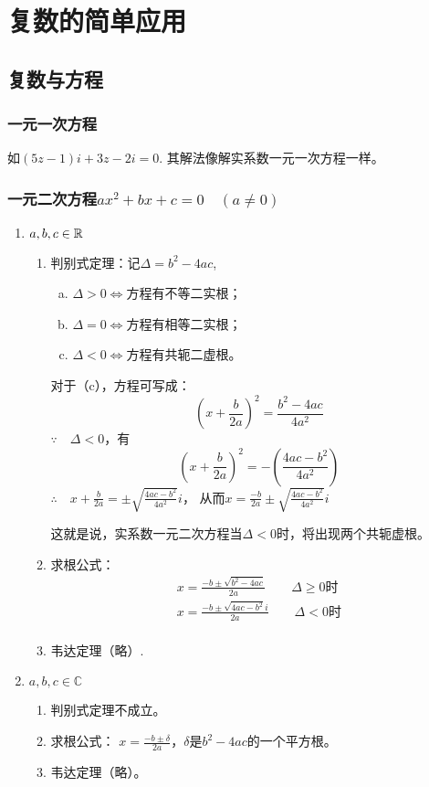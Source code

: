 \section{复数的简单应用}
\subsection{复数与方程}
\subsubsection{一元一次方程}

如$(5z-1)i+3z-2i=0$. 其解法像解实系数一元一次方程一样。

\subsubsection{一元二次方程$ax^2+bx+c=0\quad (a\ne 0)$}

\begin{enumerate}
    \item $a,b,c\in\mathbb{R}$
\begin{enumerate}[(1)]
    \item 判别式定理：记$\Delta=b^2-4ac$,
\begin{enumerate}[(a)]
\item $\Delta >0\Longleftrightarrow $方程有不等二实根；
\item $\Delta =0\Longleftrightarrow $方程有相等二实根；
\item $\Delta <0\Longleftrightarrow $方程有共轭二虚根。
\end{enumerate}
    对于（c），方程可写成：
\[\left(x+\frac{b}{2a}\right)^2=\frac{b^2-4ac}{4a^2}\]
$\because\quad \Delta <0$，有
\[\left(x+\frac{b}{2a}\right)^2=-\left(\frac{4ac-b^2}{4a^2}\right)\]
$\therefore\quad x+\frac{b}{2a}=\pm\sqrt{\frac{4ac-b^2}{4a^2}}i$，
从而$x=\frac{-b}{2a}\pm\sqrt{\frac{4ac-b^2}{4a^2}}i$

这就是说，实系数一元二次方程当$\Delta <0$时，将出现两个共轭虚根。
\item 求根公式：
\[\begin{split}
    x=\frac{-b\pm\sqrt{b^2-4ac}}{2a}\qquad \Delta \ge 0\text{时}\\
    x=\frac{-b\pm\sqrt{4ac-b^2}i}{2a}\qquad \Delta < 0\text{时}\\
\end{split}\]
\item 韦达定理（略）.
\end{enumerate}

\item $a,b,c\in\mathbb{C}$
\begin{enumerate}[(1)]
    \item 判别式定理不成立。
    \item 求根公式：
    $x=\frac{-b\pm\delta}{2a}$，$\delta$是$b^2-4ac$的一个平方根。
    \item 韦达定理（略）。
\end{enumerate}
\end{enumerate}

